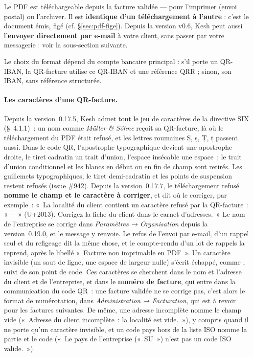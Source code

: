 \documentclass[a4paper,11pt,oneside]{article}
\begin{document}
Le PDF est téléchargeable depuis la facture validée — pour l'imprimer (envoi postal) ou l'archiver. Il est \textbf{identique d'un téléchargement à l'autre} : c'est le document émis, figé (cf. \S\ref{sec:pdf-fige}). Depuis la version v0.6, Kesh peut aussi l'\textbf{envoyer directement par e-mail} à votre client, sans passer par votre messagerie : voir la sous-section suivante.

\begin{keshtip}
Le choix du format dépend du compte bancaire principal : s'il porte un QR-IBAN, la QR-facture utilise ce QR-IBAN et une référence QRR ; sinon, son IBAN, sans référence structurée.
\end{keshtip}

\paragraph{Les caractères d'une QR-facture.} Depuis la version~0.17.5, Kesh admet tout le jeu de caractères de la directive SIX (\S~4.1.1)~: un nom comme \emph{Müller \& Söhne} reçoit sa QR-facture, là où le téléchargement du PDF était refusé, et les lettres roumaines Ș, ș, Ț, ț passent aussi. Dans le code QR, l'apostrophe typographique devient une apostrophe droite, le tiret cadratin un trait d'union, l'espace insécable une espace~; le trait d'union conditionnel et les blancs en début ou en fin de champ sont retirés. Les guillemets typographiques, le tiret demi-cadratin et les points de suspension restent refusés (issue \#942). Depuis la version~0.17.7, le téléchargement refusé \textbf{nomme le champ et le caractère à corriger}, et dit où le corriger, par exemple~: «~La localité du client contient un caractère refusé par la QR-facture~: «~–~» (U+2013). Corrigez la fiche du client dans le carnet d'adresses.~» Le nom de l'entreprise se corrige dans \emph{Paramètres → Organisation} depuis la version~0.19.0, et le message y renvoie. Le refus de l'envoi par e-mail, d'un rappel seul et du refigeage dit la même chose, et le compte-rendu d'un lot de rappels la reprend, après le libellé «~Facture non imprimable en PDF~». Un caractère invisible (un saut de ligne, une espace de largeur nulle) s'écrit échappé, comme , suivi de son point de code. Ces caractères se cherchent dans le nom et l'adresse du client et de l'entreprise, et dans le \textbf{numéro de facture}, qui entre dans la communication du code QR~: une facture validée ne se corrige pas, c'est alors le format de numérotation, dans \emph{Administration → Facturation}, qui est à revoir pour les factures suivantes. De même, une adresse incomplète nomme le champ vide («~Adresse du client incomplète~: la localité est vide.~»), y compris quand il ne porte qu'un caractère invisible, et un code pays hors de la liste ISO nomme la partie et le code («~Le pays de l'entreprise («~SU~») n'est pas un code ISO valide.~»).
\end{document}
